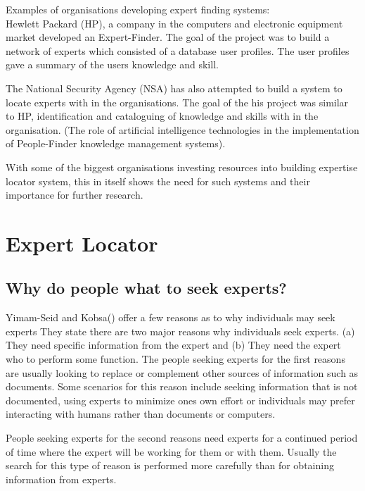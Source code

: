 \documentclass[a4paper,oneside,11pt]{report}
\begin{document}
Examples of organisations developing expert finding systems: \\
Hewlett Packard (HP), a company in the computers and electronic equipment market developed  an Expert-Finder. The goal of the project was to build a network of experts which consisted of a database user profiles. The user profiles gave a summary of the users knowledge and skill. 

The National Security Agency (NSA) has also attempted to build a system to locate experts with in the organisations. The goal of the his project was similar to HP, identification and cataloguing of knowledge and skills with in the organisation. 
(The role of artificial intelligence technologies in the implementation of People-Finder knowledge management systems).

With some of the biggest organisations investing resources into building expertise locator system, this in itself shows the need for such systems and their importance for further research. 

\section{Expert Locator}
\subsection{Why do people what to seek experts?}
Yimam-Seid and Kobsa(\citeyear{kobsaseid2003}) offer a few reasons as to why individuals may seek experts They state there are two major reasons why individuals seek experts. (a) They need specific information from the expert and (b) They need the expert who to perform some function. The people seeking experts for the first reasons are usually looking to replace or complement other sources of information such as documents. Some scenarios for this reason include seeking information that is not documented, using experts to minimize ones own effort or individuals may prefer interacting with humans rather than documents or computers. 

People seeking experts for the second reasons need experts for a continued period of time where the expert will be working for them or with them. Usually the search for this type of reason is performed more carefully than for obtaining information from experts.


\
\end{document}
